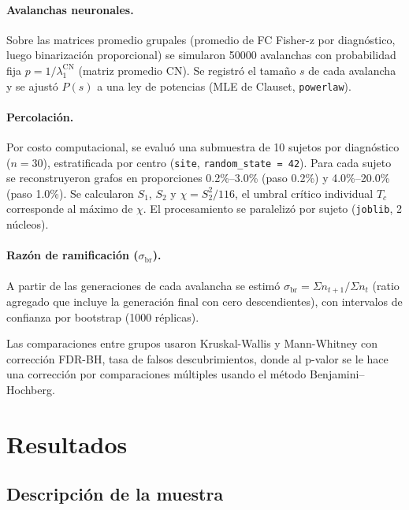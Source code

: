 \documentclass[12pt,a4paper]{article}
\begin{document}
\paragraph{Avalanchas neuronales.} Sobre las matrices promedio grupales (promedio de FC Fisher-z
por diagnóstico, luego binarización proporcional) se simularon 50000 avalanchas con probabilidad fija $p = 1/\lambda_1^{\text{CN}}$ (matriz promedio CN)\cite{beggs2003}. Se registró el tamaño $s$ de cada avalancha y se ajustó $P(s)$ a una ley de potencias (MLE de Clauset\cite{clauset2009}, \texttt{powerlaw}).

\paragraph{Percolación.} Por costo computacional, se evaluó una submuestra de 10 sujetos por
diagnóstico ($n = 30$), estratificada por centro (\texttt{site}, \texttt{random\_state = 42}). Para cada sujeto se reconstruyeron grafos en proporciones 0.2\%--3.0\% (paso 0.2\%) y 4.0\%--20.0\% (paso 1.0\%). Se calcularon $S_1$, $S_2$ y $\chi = S_2^2 / 116$, el umbral crítico individual $T_c$ corresponde al máximo de $\chi$. El procesamiento se paralelizó por sujeto (\texttt{joblib}, 2 núcleos).

\paragraph{Razón de ramificación ($\sigma_{\text{br}}$).} A partir de las generaciones de cada avalancha se estimó $\sigma_{\text{br}} = \Sigma n_{t+1} / \Sigma n_t$ (ratio agregado que incluye la generación final con cero descendientes)\cite{beggs2003}, con intervalos de confianza por bootstrap (1000 réplicas).

Las comparaciones entre grupos usaron Kruskal-Wallis y Mann-Whitney con corrección FDR-BH, tasa de falsos descubrimientos, donde al p-valor se le hace una corrección por comparaciones múltiples usando el método Benjamini–Hochberg.

\section{Resultados}

\subsection{Descripción de la muestra}
\end{document}
